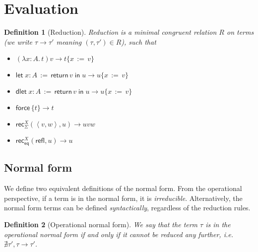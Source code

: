 \documentclass[a4,natbib=false]{article}
\newtheorem{definition}{Definition}
\newcommand{\fun}[2]{\lambda {#1}.\,{#2}}
\newcommand{\letname}{\mathsf{let}}
\newcommand{\dletname}{\mathsf{dlet}}
\newcommand{\letval}[3]{\letname\; {#1} \,:=\, {#2} \;\mathsf{in}\; {#3}}
\newcommand{\dletval}[3]{\dletname\; {#1} \,:=\, {#2} \;\mathsf{in}\; {#3}}
\newcommand{\pair}[2]{\left\langle{#1}, {#2}\right\rangle}
\newcommand{\refl}{\mathsf{refl}}
\newcommand{\force}[1]{\mathsf{force}\,{#1}}
\newcommand{\return}[1]{\mathsf{return}\,{#1}}
\newcommand{\thunk}[1]{\{{#1}\}}
\newcommand{\recsigma}[3]{\mathsf{rec}_{\Sigma}^{#2}({#1},{#3})}
\newcommand{\receq}[3]{\mathsf{rec}_{\mathsf{eq}}^{#2}({#1},{#3})}
\newcommand{\subst}[3]{{#1}\{{#2}\,:=\,{#3}\}}
\newcommand{\reduces}[2]{{#1} \rightarrow {#2}}
\begin{document}
\section{Evaluation}
\label{sec:equality}

\begin{definition}[Reduction]
Reduction is a minimal congruent
relation $R$ on terms (we write $\reduces{\tau}{\tau'}$ meaning $(\tau,\tau') \in R$), such that

\begin{multicols}{2}
\begin{itemize}
  \item $\reduces{(\fun{x:A}{t})v}{\subst{t}{x}{v}}$

  \item $\reduces{\letval{x:A}{\return{v}}{u}}{\subst{u}{x}{v}}$

  \item $\reduces{\dletval{x:A}{\return{v}}{u}}{\subst{u}{x}{v}}$

  \item $\reduces{\force{\thunk{t}}}{t}$

  \item $\reduces{\recsigma{\pair{v}{w}}{X}{u}}{u v w}$

  \item $\reduces{\receq{\refl}{X}{u}}{u}$

\end{itemize}
\end{multicols}
\end{definition}


\subsection{Normal form}

We define two equivalent definitions of the normal form. From the operational
perspective, if a term is in the normal form, it is \emph{irreducible}. Alternatively,
the normal form terms can be defined \emph{syntactically}, regardless of the reduction rules.

\begin{definition}[Operational normal form]
  We say that the term $\tau$ is in the operational
  normal form if and only if it cannot be reduced any further, i.e.
  $\nexists \tau', \reduces{\tau}{\tau'}$.
\end{definition}
\end{document}
